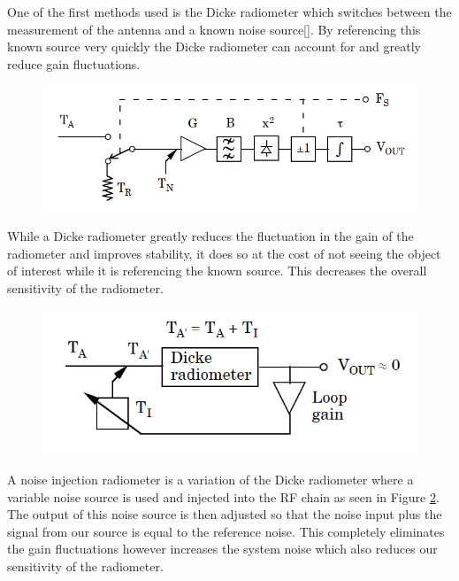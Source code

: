 One of the first methods used is the Dicke radiometer which switches between the measurement of the antenna and a known noise source[\cite{Dicke}].  By referencing this known source very quickly the Dicke radiometer can account for and greatly reduce gain fluctuations.  

{\begin{figure}[h!tb] 
\centering
\includegraphics[width=\textwidth]{Images/Dicke_block.png}
\label{dicke_radiometer}
\end{figure}
}

While a Dicke radiometer greatly reduces the fluctuation in the gain of the radiometer and improves stability, it does so at the cost of not seeing the object of interest while it is referencing the known source.  This decreases the overall sensitivity of the radiometer.

{\begin{figure}[h!tb] 
\centering
\includegraphics[width=\textwidth]{Images/NoiseInj_block.png}
\label{NoiseInj_radiometer}
\end{figure}
}

A noise injection radiometer is a variation of the Dicke radiometer where a variable noise source is used and injected into the RF chain as seen in Figure \ref{NoiseInj_radiometer}.  The output of this noise source is then adjusted so that the noise input plus the signal from our source is equal to the reference noise.  This completely eliminates the gain fluctuations however increases the system noise which also reduces our sensitivity of the radiometer.

